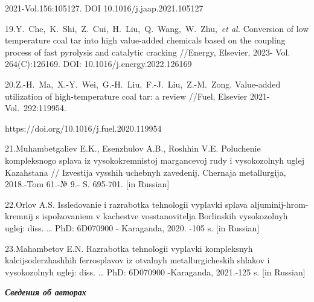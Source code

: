 \begin{noparindent}
2021-Vol.156:105127. DOI 10.1016/j.jaap.2021.105127

19.Y.~Che,~K.~Shi,~Z.~Cui,~H.~Liu,~Q.~Wang,~W.~Zhu,~\emph{et al.}
Conversion of low temperature coal tar into high value-added chemicals
based on the coupling process of fast pyrolysis and catalytic cracking
//Energy, Elsevier, 2023- Vol. 264(C):126169. DOI:
10.1016/j.energy.2022.126169

20.Z.-H.~Ma,~X.-Y.~Wei,~G.-H.~Liu,~F.-J.~Liu,~Z.-M.~Zong. Value-added
utilization of high-temperature coal tar: a review //Fuel, Elsevier
2021- Vol.~292:119954.

https://doi.org/10.1016/j.fuel.2020.119954

21.Muhambetgaliev E.K., Esenzhulov A.B., Roshhin V.E. Poluchenie
kompleksnogo splava iz vysokokremnistoj margancevoj rudy i
vysokozol\textquotesingle nyh uglej Kazahstana // Izvestija vysshih
uchebnyh zavedenij. Chernaja metallurgija, 2018.-Tom 61.-№ 9.- S.
695-701. {[}in Russian{]}

22.Orlov A.S. Issledovanie i razrabotka tehnologii vyplavki splava
aljuminij-hrom-kremnij s ispol\textquotesingle zovaniem v kachestve
vosstanovitelja Borlinskih vysokozol\textquotesingle nyh uglej: diss.
\ldots{} PhD: 6D070900 - Karaganda, 2020. -105 s. {[}in Russian{]}

23.Mahambetov E.N. Razrabotka tehnologii vyplavki kompleksnyh
kal\textquotesingle cijsoderzhashhih ferrosplavov iz
otval\textquotesingle nyh metallurgicheskih shlakov i
vysokozol\textquotesingle nyh uglej: diss. \ldots{} PhD: 6D070900
-Karaganda, 2021.-125 s. {[}in Russian{]}
\end{noparindent}

\emph{{\bfseries Сведения об авторах}}

